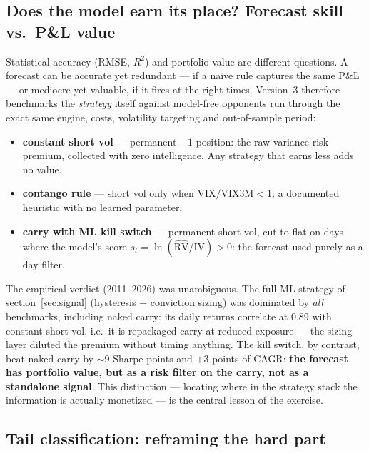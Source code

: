 \documentclass[11pt,a4paper]{article}
\newcommand{\RV}{\mathrm{RV}}
\newcommand{\IV}{\mathrm{IV}}
\begin{document}
\subsection{Does the model earn its place? Forecast skill vs.\ P\&L value}

Statistical accuracy (RMSE, $R^2$) and portfolio value are different
questions. A forecast can be accurate yet redundant --- if a naive rule
captures the same P\&L --- or mediocre yet valuable, if it fires at the right
times. Version~3 therefore benchmarks the \emph{strategy} itself against
model-free opponents run through the exact same engine, costs, volatility
targeting and out-of-sample period:
\begin{itemize}
\item \textbf{constant short vol} --- permanent $-1$ position: the raw
  variance risk premium, collected with zero intelligence. Any strategy that
  earns less adds no value.
\item \textbf{contango rule} --- short vol only when
  $\mathrm{VIX}/\mathrm{VIX3M} < 1$; a documented heuristic with no learned
  parameter.
\item \textbf{carry with ML kill switch} --- permanent short vol, cut to flat
  on days where the model's score $s_t = \ln(\widehat{\RV}/\IV) > 0$: the
  forecast used purely as a day filter.
\end{itemize}

The empirical verdict (2011--2026) was unambiguous. The full ML strategy of
section~\ref{sec:signal} (hysteresis + conviction sizing) was dominated by
\emph{all} benchmarks, including naked carry: its daily returns correlate at
$0.89$ with constant short vol, i.e.\ it is repackaged carry at reduced
exposure --- the sizing layer diluted the premium without timing anything.
The kill switch, by contrast, beat naked carry by $\sim$9 Sharpe points and
$+3$ points of CAGR: \textbf{the forecast has portfolio value, but as a risk
filter on the carry, not as a standalone signal}. This distinction ---
locating where in the strategy stack the information is actually monetized
--- is the central lesson of the exercise.

\subsection{Tail classification: reframing the hard part}
\end{document}
